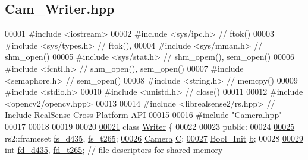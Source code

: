 \hypertarget{Cam__Writer_8hpp_source}{}\subsection{Cam\+\_\+\+Writer.\+hpp}
\label{Cam__Writer_8hpp_source}

\begin{DoxyCode}
00001 \textcolor{preprocessor}{#include <iostream>} 
00002 \textcolor{preprocessor}{#include <sys/ipc.h>} \textcolor{comment}{// ftok()}
00003 \textcolor{preprocessor}{#include <sys/types.h>} \textcolor{comment}{// ftok(),}
00004 \textcolor{preprocessor}{#include <sys/mman.h>} \textcolor{comment}{// shm\_open()}
00005 \textcolor{preprocessor}{#include <sys/stat.h>} \textcolor{comment}{// shm\_opem(), sem\_open()}
00006 \textcolor{preprocessor}{#include <fcntl.h>} \textcolor{comment}{// shm\_open(), sem\_open()}
00007 \textcolor{preprocessor}{#include <semaphore.h>} \textcolor{comment}{// sem\_open()}
00008 \textcolor{preprocessor}{#include <string.h>} \textcolor{comment}{// memcpy()}
00009 \textcolor{preprocessor}{#include <stdio.h>} 
00010 \textcolor{preprocessor}{#include <unistd.h>} \textcolor{comment}{// close()}
00011 
00012 \textcolor{preprocessor}{#include <opencv2/opencv.hpp>}
00013 
00014 \textcolor{preprocessor}{#include <librealsense2/rs.hpp>}     \textcolor{comment}{// Include RealSense Cross Platform API}
00015 
00016 \textcolor{preprocessor}{#include "\hyperlink{Camera_8hpp}{Camera.hpp}"}
00017 
00018 
00019 
00020 
\hypertarget{Cam__Writer_8hpp_source.tex_l00021}{}\hyperlink{classWriter}{00021} \textcolor{keyword}{class }\hyperlink{classWriter}{Writer} \{
00022 
00023 \textcolor{keyword}{public}:
00024 
\hypertarget{Cam__Writer_8hpp_source.tex_l00025}{}\hyperlink{classWriter_a30bbe10cfaf2e4310ac34edb3b5024cf}{00025}     rs2::frameset \hyperlink{classWriter_afbf490edaf8145084a3e6e0afe770d2d}{fs\_d435}, \hyperlink{classWriter_a30bbe10cfaf2e4310ac34edb3b5024cf}{fs\_t265};
\hypertarget{Cam__Writer_8hpp_source.tex_l00026}{}\hyperlink{classWriter_a5bd1f2b9e0a6250fc48d2f34cd2260e8}{00026}     \hyperlink{classCamera}{Camera} \hyperlink{classWriter_a5bd1f2b9e0a6250fc48d2f34cd2260e8}{C};
\hypertarget{Cam__Writer_8hpp_source.tex_l00027}{}\hyperlink{classWriter_ab564a66fcd4c18866c3cddc48682d198}{00027}     \hyperlink{structBool__Init}{Bool\_Init} \hyperlink{classWriter_ab564a66fcd4c18866c3cddc48682d198}{b};
00028 
\hypertarget{Cam__Writer_8hpp_source.tex_l00029}{}\hyperlink{classWriter_a36ab21701792358b8a1c38fb805d1330}{00029}     \textcolor{keywordtype}{int} \hyperlink{classWriter_ae1327a774b081c2b229f46415148dd2a}{fd\_d435}, \hyperlink{classWriter_a36ab21701792358b8a1c38fb805d1330}{fd\_t265}; \textcolor{comment}{// file descriptors for shared memory}

\end{DoxyCode}
